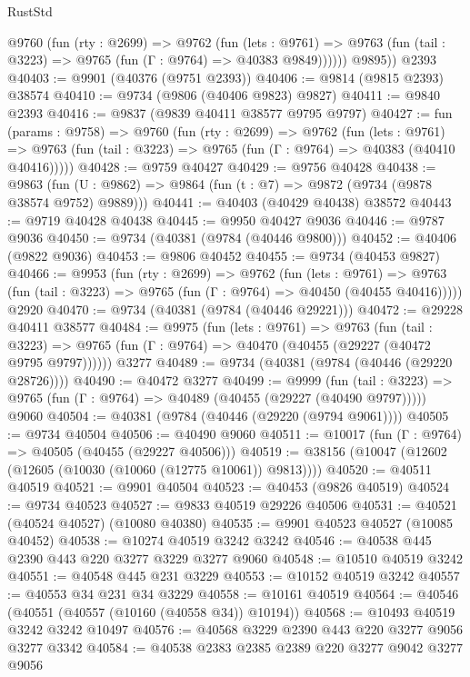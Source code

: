 \begin{lexlean}{RustStd}
\begin{coremodule}
          @9760
            (fun (rty : @2699) =>
            @9762
              (fun (lets : @9761) =>
              @9763 (fun (tail : @3223) => @9765 (fun (Γ : @9764) => @40383 @9849))))))
        @9895))
    @2393
@40403 := @9901 (@40376 (@9751 @2393))
@40406 := @9814 (@9815 @2393) @38574
@40410 := @9734 (@9806 (@40406 @9823) @9827)
@40411 := @9840 @2393
@40416 := @9837 (@9839 @40411 @38577 @9795 @9797)
@40427 := fun (params : @9758) =>
  @9760
    (fun (rty : @2699) =>
    @9762
      (fun (lets : @9761) =>
      @9763 (fun (tail : @3223) => @9765 (fun (Γ : @9764) => @40383 (@40410 @40416)))))
@40428 := @9759 @40427
@40429 := @9756 @40428
@40438 := @9863
    (fun (U : @9862) => @9864 (fun (t : @7) => @9872 (@9734 (@9878 @38574 @9752) @9889)))
@40441 := @40403 (@40429 @40438) @38572
@40443 := @9719 @40428 @40438
@40445 := @9950 @40427 @9036
@40446 := @9787 @9036
@40450 := @9734 (@40381 (@9784 (@40446 @9800)))
@40452 := @40406 (@9822 @9036)
@40453 := @9806 @40452
@40455 := @9734 (@40453 @9827)
@40466 := @9953
    (fun (rty : @2699) =>
    @9762
      (fun (lets : @9761) =>
      @9763 (fun (tail : @3223) => @9765 (fun (Γ : @9764) => @40450 (@40455 @40416)))))
    @2920
@40470 := @9734 (@40381 (@9784 (@40446 @29221)))
@40472 := @29228 @40411 @38577
@40484 := @9975
    (fun (lets : @9761) =>
    @9763
      (fun (tail : @3223) =>
      @9765 (fun (Γ : @9764) => @40470 (@40455 (@29227 (@40472 @9795 @9797))))))
    @3277
@40489 := @9734 (@40381 (@9784 (@40446 (@29220 @28726))))
@40490 := @40472 @3277
@40499 := @9999
    (fun (tail : @3223) => @9765 (fun (Γ : @9764) => @40489 (@40455 (@29227 (@40490 @9797)))))
    @9060
@40504 := @40381 (@9784 (@40446 (@29220 (@9794 @9061))))
@40505 := @9734 @40504
@40506 := @40490 @9060
@40511 := @10017 (fun (Γ : @9764) => @40505 (@40455 (@29227 @40506)))
@40519 := @38156 (@10047 (@12602 (@12605 (@10030 (@10060 (@12775 @10061)) @9813))))
@40520 := @40511 @40519
@40521 := @9901 @40504
@40523 := @40453 (@9826 @40519)
@40524 := @9734 @40523
@40527 := @9833 @40519 @29226 @40506
@40531 := @40521 (@40524 @40527) (@10080 @40380)
@40535 := @9901 @40523 @40527 (@10085 @40452)
@40538 := @10274 @40519 @3242 @3242
@40546 := @40538 @445 @2390 @443 @220 @3277 @3229 @3277 @9060
@40548 := @10510 @40519 @3242
@40551 := @40548 @445 @231 @3229
@40553 := @10152 @40519 @3242
@40557 := @40553 @34 @231 @34 @3229
@40558 := @10161 @40519
@40564 := @40546 (@40551 (@40557 (@10160 (@40558 @34)) @10194))
@40568 := @10493 @40519 @3242 @3242 @10497
@40576 := @40568 @3229 @2390 @443 @220 @3277 @9056 @3277 @3342
@40584 := @40538 @2383 @2385 @2389 @220 @3277 @9042 @3277 @9056

\end{coremodule}
\end{lexlean}
